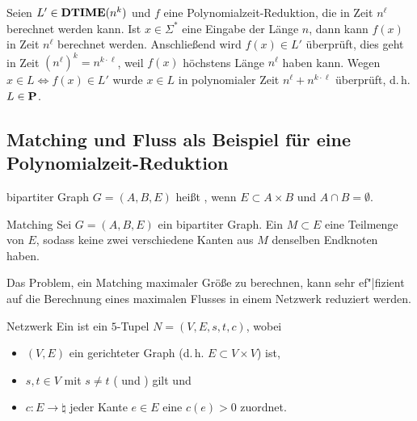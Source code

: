\begin{Beweis}
    Seien $L' \in \DTIME(n^k)$ und $f$ eine Polynomialzeit-Reduktion, die in
    Zeit $n^\ell$ berechnet werden kann.
    Ist $x \in \Sigma^\ast$ eine Eingabe der Länge $n$, dann
    kann $f(x)$ in Zeit $n^\ell$ berechnet werden.
    Anschließend wird $f(x) \in L'$ überprüft, dies geht in Zeit $(n^\ell)^k = n^{k \cdot \ell}$,
    weil $f(x)$ höchstens Länge $n^\ell$ haben kann.
    Wegen $x \in L \iff f(x) \in L'$ wurde $x \in L$ in
    polynomialer Zeit $n^\ell + n^{k \cdot \ell}$ überprüft, d.\,h. $L \in \P$.
\end{Beweis}

\subsection{%
    Matching und Fluss als Beispiel für eine Polynomialzeit-Reduktion%
}

\begin{Def}{bipartiter Graph}
    $G = (A, B, E)$ heißt , wenn $E \subset A \times B$
    und $A \cap B = \emptyset$.
\end{Def}

\begin{Def}{Matching}
    Sei $G = (A, B, E)$ ein bipartiter Graph.
    Ein  $M \subset E$ eine Teilmenge von $E$, sodass keine zwei
    verschiedene Kanten aus $M$ denselben Endknoten haben.
\end{Def}

\linie

\begin{Bem}
    Das Problem, ein Matching maximaler Größe zu berechnen,
    kann sehr ef"|fizient auf die Berechnung eines maximalen Flusses in einem Netzwerk
    reduziert werden.
\end{Bem}

\begin{Def}{Netzwerk}
    Ein  ist ein $5$-Tupel $N = (V, E, s, t, c)$, wobei
    \begin{itemize}
        \item
        $(V, E)$ ein gerichteter Graph (d.\,h. $E \subset V \times V$) ist,

        \item
        $s, t \in V$ mit $s \not= t$ ( und ) gilt und

        \item
        $c\colon E \rightarrow \natural$ jeder Kante $e \in E$ eine 
        $c(e) > 0$ zuordnet.
    \end{itemize}
\end{Def}

